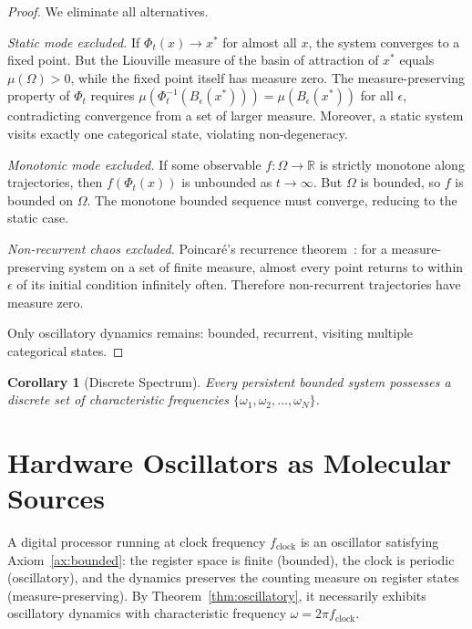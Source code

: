\documentclass[twocolumn,10pt,a4paper]{article}
\theoremstyle{plain}
\newtheorem{corollary}[theorem]{Corollary}
\theoremstyle{definition}
\theoremstyle{remark}
\begin{document}
\begin{proof}
We eliminate all alternatives.

\emph{Static mode excluded.} If $\Phi_t(x) \to x^*$ for almost all $x$, the system converges to a fixed point. But the Liouville measure of the basin of attraction of $x^*$ equals $\mu(\Omega) > 0$, while the fixed point itself has measure zero. The measure-preserving property of $\Phi_t$ requires $\mu(\Phi_t^{-1}(B_\epsilon(x^*))) = \mu(B_\epsilon(x^*))$ for all $\epsilon$, contradicting convergence from a set of larger measure. Moreover, a static system visits exactly one categorical state, violating non-degeneracy.

\emph{Monotonic mode excluded.} If some observable $f : \Omega \to \mathbb{R}$ is strictly monotone along trajectories, then $f(\Phi_t(x))$ is unbounded as $t \to \infty$. But $\Omega$ is bounded, so $f$ is bounded on $\Omega$. The monotone bounded sequence must converge, reducing to the static case.

\emph{Non-recurrent chaos excluded.} Poincar\'{e}'s recurrence theorem~\cite{poincare1890}: for a measure-preserving system on a set of finite measure, almost every point returns to within $\epsilon$ of its initial condition infinitely often. Therefore non-recurrent trajectories have measure zero.

Only oscillatory dynamics remains: bounded, recurrent, visiting multiple categorical states.
\end{proof}

\begin{corollary}[Discrete Spectrum]
\label{cor:spectrum}
Every persistent bounded system possesses a discrete set of characteristic frequencies $\{\omega_1, \omega_2, \ldots, \omega_N\}$.
\end{corollary}

\section{Hardware Oscillators as Molecular Sources}
\label{sec:hardware}

A digital processor running at clock frequency $f_{\mathrm{clock}}$ is an oscillator satisfying Axiom~\ref{ax:bounded}: the register space is finite (bounded), the clock is periodic (oscillatory), and the dynamics preserves the counting measure on register states (measure-preserving). By Theorem~\ref{thm:oscillatory}, it necessarily exhibits oscillatory dynamics with characteristic frequency $\omega = 2\pi f_{\mathrm{clock}}$.
\end{document}
